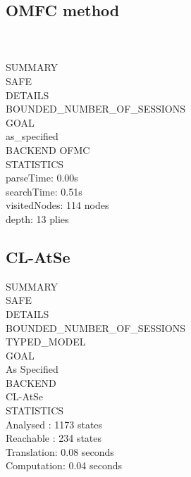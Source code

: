 \subsection{OMFC method}
\color{lstgrey}{\% OFMC}\\
\color{lstgrey}{\% Version of 2006/02/13}\\
\color{black}
SUMMARY\\
SAFE\\
\linebreak
DETAILS\\
BOUNDED\_NUMBER\_OF\_SESSIONS\\
\linebreak
GOAL\\
as\_specified\\
\linebreak
BACKEND
OFMC\\
\linebreak
STATISTICS\\
parseTime: 0.00s\\
searchTime: 0.51s\\
visitedNodes: 114 nodes\\
depth: 13 plies

\subsection{CL-AtSe}
SUMMARY\\
SAFE\\
\linebreak
DETAILS\\
BOUNDED\_NUMBER\_OF\_SESSIONS\\
TYPED\_MODEL\\
\linebreak
GOAL\\
As Specified\\
\linebreak
BACKEND\\
CL-AtSe\\
\linebreak
STATISTICS\\
Analysed   : 1173 states\\
Reachable  : 234 states\\
Translation: 0.08 seconds\\
Computation: 0.04 seconds

